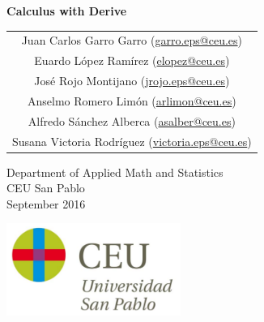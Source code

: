 \begin{titlepage}
\thispagestyle{empty}
\vspace*{7cm}
\par

\begin{center}
\normalfont\fontsize{30}{30}\selectfont
{\bfseries \color{blueceu}Calculus with Derive}
\end{center}
\vspace{1cm}

\begin{center}
\Large
\begin{tabular}{c}
Juan Carlos Garro Garro (\url{garro.eps@ceu.es})\\
Euardo López Ramírez (\url{elopez@ceu.es})\\
José Rojo Montijano (\url{jrojo.eps@ceu.es})\\
Anselmo Romero Limón (\url{arlimon@ceu.es})\\
Alfredo Sánchez Alberca (\href{mailto:asalber@ceu.es}{asalber@ceu.es})\\
Susana Victoria Rodríguez (\url{victoria.eps@ceu.es})
\end{tabular}

\medskip 
Department of Applied Math and Statistics\\ CEU San Pablo\\[1cm]
\medskip 
September 2016

\vspace{1cm}
\includegraphics[height=3cm]{img/logo_uspceu}
\end{center}
\vfill
\end{titlepage}